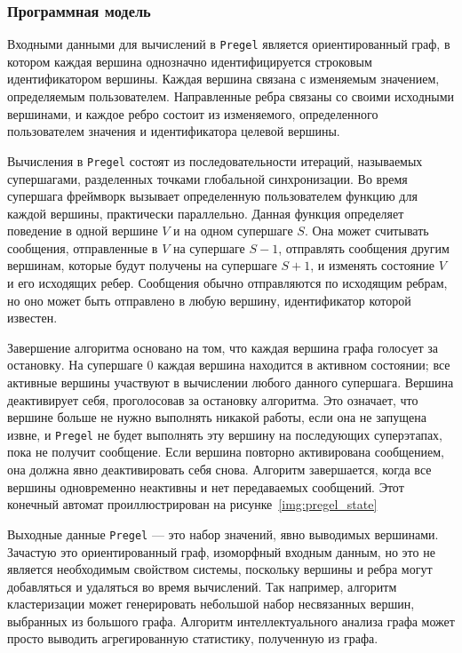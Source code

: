 \subsubsection{Программная модель}

Входными данными для вычислений в \texttt{Pregel} является ориентированный граф, в котором каждая вершина однозначно идентифицируется строковым идентификатором вершины. 
Каждая вершина связана с изменяемым значением, определяемым пользователем. 
Направленные ребра связаны со своими исходными вершинами, и каждое ребро состоит из изменяемого, определенного пользователем значения и идентификатора целевой вершины.

Вычисления в \texttt{Pregel} состоят из последовательности итераций, называемых супершагами, разделенных точками глобальной синхронизации.
Во время супершага фреймворк вызывает определенную пользователем функцию для каждой вершины, практически параллельно. 
Данная функция определяет поведение в одной вершине $V$ и на одном супершаге $S$. 
Она может считывать сообщения, отправленные в $V$ на супершаге $S − 1$, отправлять сообщения другим вершинам, которые будут получены на супершаге $S + 1$, и изменять состояние $V$ и его исходящих ребер. 
Сообщения обычно отправляются по исходящим ребрам, но оно может быть отправлено в любую вершину, идентификатор которой известен.

Завершение алгоритма основано на том, что каждая вершина графа голосует за остановку. 
На супершаге 0 каждая вершина находится в активном состоянии; все активные вершины участвуют в вычислении любого данного супершага. 
Вершина деактивирует себя, проголосовав за остановку алгоритма. 
Это означает, что вершине больше не нужно выполнять никакой работы, если она не запущена извне, и \texttt{Pregel} не будет выполнять эту вершину на последующих суперэтапах, пока не получит сообщение. 
Если вершина повторно активирована сообщением, она должна явно деактивировать себя снова. 
Алгоритм завершается, когда все вершины одновременно неактивны и нет передаваемых сообщений. 
Этот конечный автомат проиллюстрирован на рисунке~\ref{img:pregel_state}


Выходные данные \texttt{Pregel} --- это набор значений, явно выводимых вершинами. 
Зачастую это ориентированный граф, изоморфный входным данным, но это не является необходимым свойством системы, поскольку вершины и ребра могут добавляться и удаляться во время вычислений. 
Так например, алгоритм кластеризации может генерировать небольшой набор несвязанных вершин, выбранных из большого графа. 
Алгоритм интеллектуального анализа графа может просто выводить агрегированную статистику, полученную из графа.

